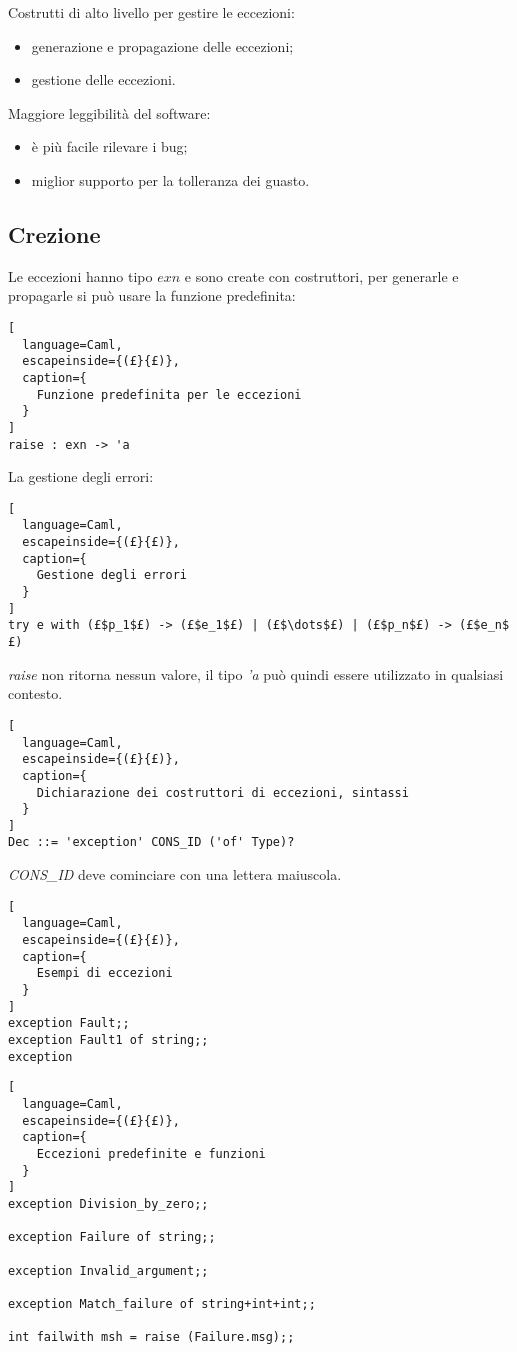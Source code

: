Costrutti di alto livello per gestire le eccezioni:
\begin{itemize}
  \item generazione e propagazione delle eccezioni;
  \item gestione delle eccezioni.
\end{itemize}

Maggiore leggibilità del software:
\begin{itemize}
  \item è più facile rilevare i bug;
  \item miglior supporto per la tolleranza dei guasto.
\end{itemize}

\subsection{Crezione}
Le eccezioni hanno tipo $exn$ e sono create con costruttori, per generarle
e propagarle si può usare la funzione predefinita:
\begin{lstlisting}[
  language=Caml,
  escapeinside={(£}{£)},
  caption={
    Funzione predefinita per le eccezioni
  }
]
raise : exn -> 'a
\end{lstlisting}

La gestione degli errori:
\begin{lstlisting}[
  language=Caml,
  escapeinside={(£}{£)},
  caption={
    Gestione degli errori
  }
]
try e with (£$p_1$£) -> (£$e_1$£) | (£$\dots$£) | (£$p_n$£) -> (£$e_n$£)
\end{lstlisting}

\emph{raise} non ritorna nessun valore, il tipo \emph{'a} può quindi
essere utilizzato in qualsiasi contesto.


\begin{lstlisting}[
  language=Caml,
  escapeinside={(£}{£)},
  caption={
    Dichiarazione dei costruttori di eccezioni, sintassi
  }
]
Dec ::= 'exception' CONS_ID ('of' Type)?
\end{lstlisting}

\emph{CONS\_ID} deve cominciare con una lettera maiuscola.


\begin{lstlisting}[
  language=Caml,
  escapeinside={(£}{£)},
  caption={
    Esempi di eccezioni
  }
]
exception Fault;;
exception Fault1 of string;;
exception 
\end{lstlisting}

\begin{lstlisting}[
  language=Caml,
  escapeinside={(£}{£)},
  caption={
    Eccezioni predefinite e funzioni
  }
]
exception Division_by_zero;;

exception Failure of string;;

exception Invalid_argument;;

exception Match_failure of string+int+int;;

int failwith msh = raise (Failure.msg);;
\end{lstlisting}

